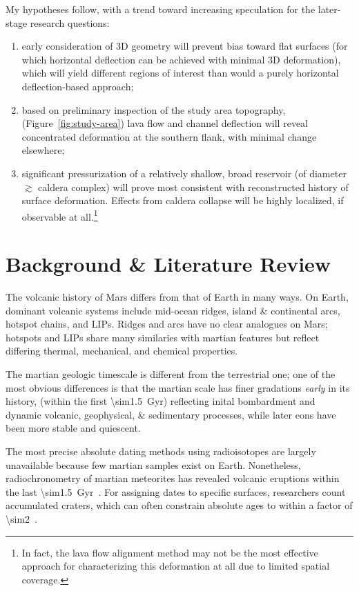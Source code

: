 My hypotheses follow, with a trend toward increasing speculation for the later-stage research questions:\begin{enumerate}
    \item early consideration of 3D geometry will prevent bias toward flat surfaces (for which horizontal deflection can be achieved with minimal 3D deformation), which will yield different regions of interest than would a purely horizontal deflection-based approach;
    \item based on preliminary inspection of the study area topography, (Figure~\ref{fig:study-area}) lava flow and channel deflection will reveal concentrated deformation at the southern flank, with minimal change elsewhere;
    \item significant pressurization of a relatively shallow, broad reservoir (of diameter $\gtrsim$ caldera complex) will prove most consistent with reconstructed history of surface deformation. Effects from caldera collapse will be highly localized, if observable at all.\footnote{In fact, the lava flow alignment method may not be the most effective approach for characterizing this deformation at all due to limited spatial coverage.}
\end{enumerate}

\section{Background \& Literature Review}

The volcanic history of Mars differs from that of Earth in many ways. On Earth, dominant volcanic systems include mid-ocean ridges, island \& continental arcs, hotspot chains, and \acp{LIP}. Ridges and arcs have no clear analogues on Mars; hotspots and \acp{LIP} share many similaries with martian features but reflect differing thermal, mechanical, and chemical properties.

The martian geologic timescale is different from the terrestrial one; one of the most obvious differences is that the martian scale has finer gradations \textit{early} in its history, (within the first \qty{\sim1.5}{Gyr}) reflecting inital bombardment and dynamic volcanic, geophysical, \& sedimentary processes, while later eons have been more stable and quiescent.

The most precise absolute dating methods using radioisotopes are largely unavailable because few martian samples exist on Earth. Nonetheless, radiochronometry of martian meteorites has revealed volcanic eruptions within the last \qty{\sim1.5}{Gyr}~\parencite[e.g.,][]{cohen_taking_2017}. For assigning dates to specific surfaces, researchers count accumulated craters, which can often constrain absolute ages to within a factor of \num{\sim2}~\parencite{kneissl_map-projection-independent_2011}.

